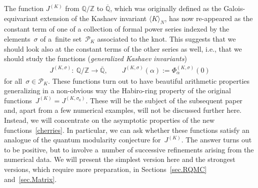\documentclass[pdftex]{sigma}
\numberwithin{equation}{section}
\def\calP{\mathcal P}
\def\calP{\mathcal P}
\def\a{\alpha}
\def\Z{\mathbb Z}
\def\Q{\mathbb Q}
\def\a{\alpha}
\def\s{\sigma}
\def\J{\mathbf J} \def\J{J} %
\def\Qbar{\overline{\Q}}
\begin{document}
The function $\J^{(K)}$ from $\Q/\Z$ to $\Qbar$, which was
originally defined as the Galois-equivariant extension of the Kashaev invariant
$\langle K\rangle_N$, has now re-appeared as the constant term
\smash{$\Phi_\a^{(K,\s_0)}(0)$} of one of a collection of formal power series
\smash{$\Phi_\a^{(K,\s)}(h)\in\Qbar[[h]]$} indexed by the elements~$\s$ of a~finite
set~$\calP_K$ associated to the knot. This suggests that we should look
also at the constant terms of the other series as well, i.e., that we should
study the functions (\emph{generalized Kashaev invariants})
\begin{gather}
\label{cherries}
\J^{(K,\s)}\colon\ \Q/\Z \to \Qbar,\qquad \J^{(K,\s)}(\a) := \Phi_\a^{(K,\s)}(0)
\end{gather}
for all~$\s\in\calP_K$. These functions turn out to have beautiful
arithmetic properties generalizing in a non-obvious way the Habiro-ring
property of the original functions~$\J^{(K)}= \J^{(K,\s_0)}$. These
will be the subject of the subsequent paper~\cite{GSZ:habiro} and, apart from
a few numerical examples, will not be discussed further here.
Instead, we will concentrate on the asymptotic properties of the new
functions~\eqref{cherries}.
In particular, we can ask whether these functions satisfy an analogue of the quantum modularity conjecture for~$\J^{(K)}$. The answer turns out to be positive,
but to involve a~number of successive refinements arising from the numerical
data. We will present the simplest version here and the strongest versions,
which require more preparation, in Sections~\ref{sec.RQMC} and~\ref{sec.Matrix}.
\end{document}
